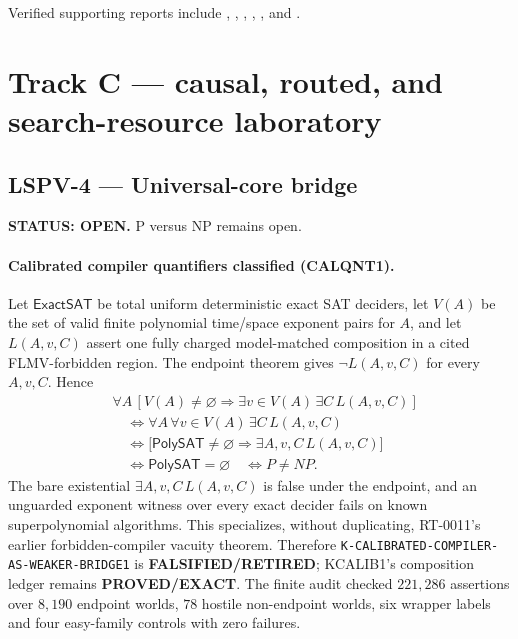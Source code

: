 \documentclass[11pt]{article}
\begin{document}
Verified supporting reports include
,
,
,
,
, and
.

\section{Track C --- causal, routed, and search-resource laboratory}

\subsection{LSPV-4 --- Universal-core bridge}
\textbf{STATUS: OPEN.} P versus NP remains open.

\paragraph{Calibrated compiler quantifiers classified (CALQNT1).}
Let \(\mathsf{ExactSAT}\) be total uniform deterministic exact SAT deciders,
let \(V(A)\) be the set of valid finite polynomial time/space exponent pairs
for \(A\), and let \(L(A,v,C)\) assert one fully charged model-matched
composition in a cited FLMV-forbidden region.  The endpoint theorem gives
\(\neg L(A,v,C)\) for every \(A,v,C\).  Hence
\[
\begin{split}
&\forall A\,[V(A)\ne\varnothing\Rightarrow
  \exists v\in V(A)\,\exists C\,L(A,v,C)]\\
&\quad\Longleftrightarrow
\forall A\,\forall v\in V(A)\,\exists C\,L(A,v,C)\\
&\quad\Longleftrightarrow
\bigl[\mathsf{PolySAT}\ne\varnothing\Rightarrow
  \exists A,v,C\,L(A,v,C)\bigr]\\
&\quad\Longleftrightarrow \mathsf{PolySAT}=\varnothing
\quad\Longleftrightarrow P\ne NP.
\end{split}
\]
The bare existential \(\exists A,v,C\,L(A,v,C)\) is false under the endpoint,
and an unguarded exponent witness over every exact decider fails on known
superpolynomial algorithms.  This specializes, without duplicating,
RT-0011's earlier forbidden-compiler vacuity theorem.  Therefore
\texttt{K-CALIBRATED-COMPILER-AS-WEAKER-BRIDGE1} is
\textbf{FALSIFIED/RETIRED}; KCALIB1's composition ledger remains
\textbf{PROVED/EXACT}.  The finite audit checked \(221{,}286\) assertions over
\(8{,}190\) endpoint worlds, \(78\) hostile non-endpoint worlds, six wrapper
labels and four easy-family controls with zero failures.
\end{document}
